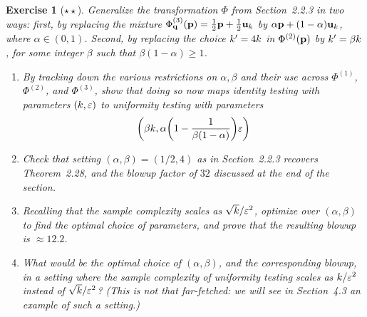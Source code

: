 \documentclass[biber,plain]{nowfnt} %
\newtheorem{question}{Exercise}[chapter]
\begin{document}
\begin{question}[$\star\star$]\label{ex:l1:reduction:parameters}
Generalize the transformation $\Phi$ from Section~2.2.3 in two ways: first, by replacing the mixture $\Phi^{(3)}_{\mathbf{q}}(\mathbf{p}) = \frac{1}{2}\mathbf{p}+\frac{1}{2}\mathbf{u}_{ k } $ by $\alpha\mathbf{p}+(1-\alpha)\mathbf{u}_{ k } $, where $\alpha\in(0,1)$. Second, by replacing the choice $k'=4k$ in $\Phi^{(2)}(\mathbf{p})$ by $k'=\beta k$, for some integer $\beta$ such that $\beta(1-\alpha)\geq 1$.
\begin{enumerate}
  \item By tracking down the various restrictions on $\alpha,\beta$ and their use across $\Phi^{(1)}$, $\Phi^{(2)}$, and $\Phi^{(3)}$, show that doing so now maps identity testing with parameters $(k,\varepsilon)$ to uniformity testing with parameters 
  \[
  	\Paren{\beta\ab,\alpha\Paren{1-\frac{1}{\beta(1-\alpha)}}\dst}
  \]
  \item Check that setting $(\alpha,\beta)=(1/2,4)$ as in Section~2.2.3 recovers Theorem~2.28, and the blowup factor of $32$ discussed at the end of the section.
  \item Recalling that the sample complexity scales as $\sqrt{k}/\varepsilon^2$, optimize over $(\alpha,\beta)$ to find the optimal choice of parameters, and prove that the resulting blowup is $\approx 12.2$. %
  \item What would be the optimal choice of $(\alpha,\beta)$, and the corresponding blowup, in a setting where the sample complexity of uniformity testing scales as $k/\varepsilon^2$ instead of $\sqrt{k}/\varepsilon^2$? (This is not that far-fetched: we will see in Section~4.3 an example of such a setting.)  %
\end{enumerate}
\end{question}
\end{document}
